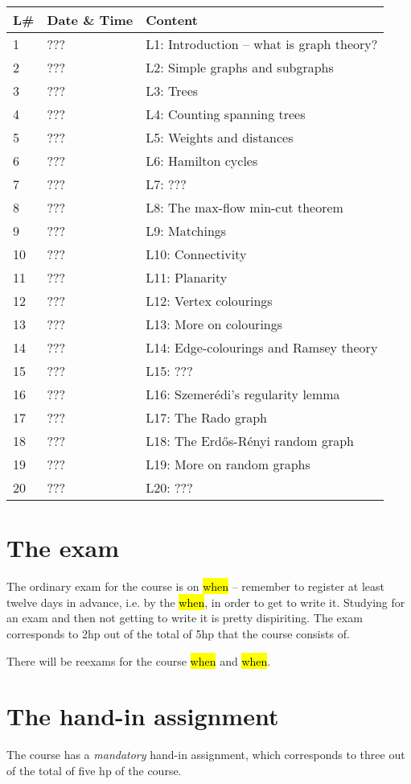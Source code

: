 \documentclass{tufte-handout}
\begin{document}
\begin{table}[h]
\begin{tabularx}{\textwidth}{llX}
L\# & Date \& Time      & Content \\ 
\midrule
1  & ??? & L1: Introduction -- what is graph theory?\\
2  & ??? & L2: Simple graphs and subgraphs\\
3  & ??? & L3: Trees\\
4  & ??? & L4: Counting spanning trees\\
5  & ??? & L5: Weights and distances\\
6  & ??? & L6: Hamilton cycles\\
7  & ??? & L7: ???\\
8  & ??? & L8: The max-flow min-cut theorem\\
9  & ??? & L9: Matchings\\
10 & ??? & L10: Connectivity\\
11 & ??? & L11: Planarity\\
12 & ??? & L12: Vertex colourings\\
13 & ??? & L13: More on colourings\\
14 & ??? & L14: Edge-colourings and Ramsey theory\\
15 & ??? & L15: ???\\
16 & ??? & L16: Szemerédi's regularity lemma\\
17 & ??? & L17: The Rado graph\\
18 & ??? & L18: The Erd\H{o}s-Rényi random graph\\
19 & ??? & L19: More on random graphs\\
20 & ??? & L20: ???
\end{tabularx}
\end{table}

\section{The exam}

The ordinary exam for the course is on \hl{when} -- remember to register at least twelve days in advance, i.e. by the \hl{when}, in order to get to write it. Studying for an exam and then not getting to write it is pretty dispiriting. The exam corresponds to 2hp out of the total of 5hp that the course consists of.

There will be reexams for the course \hl{when} and \hl{when}.

\section{The hand-in assignment}

The course has a \emph{mandatory} hand-in assignment, which corresponds to three out of the total of five hp of the course.



\end{document}
